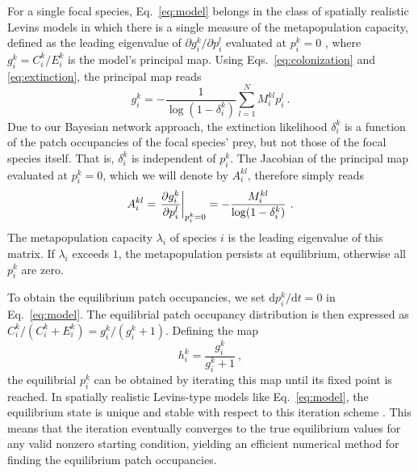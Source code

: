 \documentclass[11pt]{article}
\newcommand{\ud}{\text{d}}
\let\originalleft\left
\let\originalright\right
\renewcommand{\left}{\mathopen{}\mathclose\bgroup\originalleft}
\renewcommand{\right}{\aftergroup\egroup\originalright}
\begin{document}
For a single focal species, Eq.~\ref{eq:model} belongs in the class of spatially realistic Levins models in which there is a single measure of the metapopulation capacity, defined as the leading eigenvalue of $\partial g_i^k / \partial p_i^l$ evaluated at $p_i^k = 0$ \citep{OvaskainenHanski2001}, where $g_i^k = C_i^k / E_i^k$ is the model's principal map. Using Eqs.~\ref{eq:colonization} and \ref{eq:extinction}, the principal map reads
\begin{equation}
  \label{eq:principalmap}
  g_i^k = -\frac{1}{\log(1 - \delta_i^k)} \sum_{l=1}^N M_i^{kl} p_i^l \ .
\end{equation}
Due to our Bayesian network approach, the extinction likelihood $\delta_i^k$ is a function of the patch occupancies of the focal species' prey, but not those of the focal species itself. That is, $\delta_i^k$ is independent of $p_i^k$. The Jacobian of the principal map evaluated at $p_i^k = 0$, which we will denote by $A_i^{kl}$, therefore simply reads
\begin{equation}
  \label{eq:pmjac}
  A_i^{kl} = \left. \frac{\partial g_i^k}{\partial p_i^l} \right|_{p_i^k=0} =
  -\frac{M_i^{kl}}{\log(1 - \delta_i^k)} \ .
\end{equation}
The metapopulation capacity $\lambda_i$ of species $i$ is the leading eigenvalue of this matrix. If $\lambda_i$ exceeds $1$, the metapopulation persists at equilibrium, otherwise all $p_i^k$ are zero.

To obtain the equilibrium patch occupancies, we set $\ud p_i^k / \ud t = 0$ in Eq.~\ref{eq:model}. The equilibrial patch occupancy distribution is then expressed as $C_i^k/(C_i^k + E_i^k) = g_i^k / (g_i^k + 1)$. Defining the map
\begin{equation}
  \label{eq:itermap}
  h_i^k = \frac{g_i^k}{g_i^k + 1} \ ,
\end{equation}
the equilibrial $p_i^k$ can be obtained by iterating this map until its fixed point is reached. In spatially realistic Levins-type models like Eq.~\ref{eq:model}, the equilibrium state is unique and stable with respect to this iteration scheme \citep{OvaskainenHanski2001}. This means that the iteration eventually converges to the true equilibrium values for any valid nonzero starting condition, yielding an efficient numerical method for finding the equilibrium patch occupancies.
\end{document}
